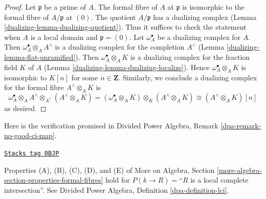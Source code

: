 \begin{proof}

Let $\mathfrak p$ be a prime of $A$. The formal fibre of $A$ at $\mathfrak p$
is isomorphic to the formal fibre of $A/\mathfrak p$ at $(0)$. The quotient
$A/\mathfrak p$ has a dualizing complex
(Lemma \ref{dualizing-lemma-dualizing-quotient}).
Thus it suffices to check the statement
when $A$ is a local domain and $\mathfrak p = (0)$.
Let $\omega_A^\bullet$ be a dualizing complex for $A$. Then
$\omega_A^\bullet \otimes_A A^\wedge$ is a dualizing complex
for the completion $A^\wedge$
(Lemma \ref{dualizing-lemma-flat-unramified}).
Then $\omega_A^\bullet \otimes_A K$ is a dualizing
complex for the fraction field $K$ of $A$
(Lemma \ref{dualizing-lemma-dualizing-localize}).
Hence $\omega_A^\bullet \otimes_A K$
is isomorphic to $K[n]$ for some $n \in \mathbf{Z}$.
Similarly, we conclude a dualizing complex for the formal fibre
$A^\wedge \otimes_A K$ is
$$
\omega_A^\bullet \otimes_A A^\wedge \otimes_{A^\wedge} (A^\wedge \otimes_A K) =
(\omega_A^\bullet \otimes_A K) \otimes_K (A^\wedge \otimes_A K) \cong
(A^\wedge \otimes_A K)[n]
$$
as desired.
\end{proof}

Here is the verification promised in
Divided Power Algebra, Remark \ref{dpa-remark-no-good-ci-map}.

\begin{lemma}
\label{dualizing-lemma-formal-fibres-lci}
\href{https://stacks.math.columbia.edu/tag/0BJP}{\texttt{Stacks tag 0BJP}}

Properties (A), (B), (C), (D), and (E) of
More on Algebra, Section \ref{more-algebra-section-properties-formal-fibres}
hold for $P(k \to R) =$``$R$ is a local complete intersection''.
See Divided Power Algebra, Definition \ref{dpa-definition-lci}.
\end{lemma}


